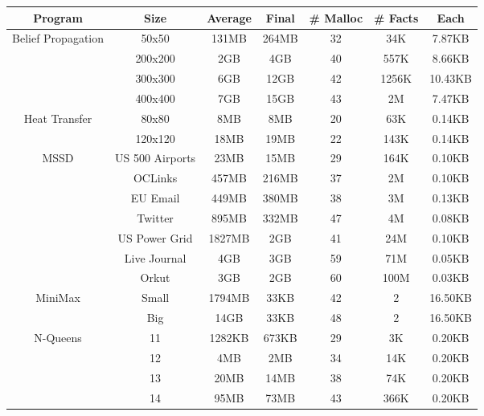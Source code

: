 \begin{tabular}{c | c || c | c | c || c c} \hline
	\textbf{Program} & \textbf{Size} & \textbf{Average} & \textbf{Final} & \textbf{\# Malloc} & \textbf{\# Facts} & \textbf{Each} \\ \hline \hline
	\multirow{4}{*}{Belief Propagation}  & 50x50 & 131MB & 264MB & 32 & 34K & 7.87KB \\
		 & 200x200 & 2GB & 4GB & 40 & 557K & 8.66KB \\
		 & 300x300 & 6GB & 12GB & 42 & 1256K & 10.43KB \\
		 & 400x400 & 7GB & 15GB & 43 & 2M & 7.47KB \\
	\hline
	\multirow{2}{*}{Heat Transfer}  & 80x80 & 8MB & 8MB & 20 & 63K & 0.14KB \\
		 & 120x120 & 18MB & 19MB & 22 & 143K & 0.14KB \\
	\hline
	\multirow{7}{*}{MSSD}  & US 500 Airports & 23MB & 15MB & 29 & 164K & 0.10KB \\
		 & OCLinks & 457MB & 216MB & 37 & 2M & 0.10KB \\
		 & EU Email & 449MB & 380MB & 38 & 3M & 0.13KB \\
		 & Twitter & 895MB & 332MB & 47 & 4M & 0.08KB \\
		 & US Power Grid & 1827MB & 2GB & 41 & 24M & 0.10KB \\
		 & Live Journal & 4GB & 3GB & 59 & 71M & 0.05KB \\
		 & Orkut & 3GB & 2GB & 60 & 100M & 0.03KB \\
	\hline
	\multirow{2}{*}{MiniMax}  & Small & 1794MB & 33KB & 42 & 2 & 16.50KB \\
		 & Big & 14GB & 33KB & 48 & 2 & 16.50KB \\
	\hline
	\multirow{4}{*}{N-Queens}  & 11 & 1282KB & 673KB & 29 & 3K & 0.20KB \\
		 & 12 & 4MB & 2MB & 34 & 14K & 0.20KB \\
		 & 13 & 20MB & 14MB & 38 & 74K & 0.20KB \\
		 & 14 & 95MB & 73MB & 43 & 366K & 0.20KB \\
	\hline
\end{tabular}
